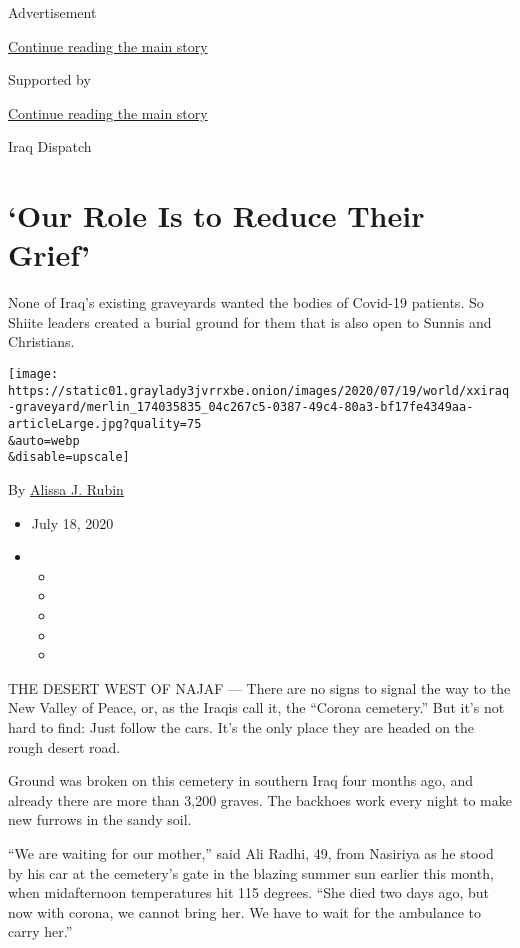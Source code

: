 Advertisement

\protect\hyperlink{after-top}{Continue reading the main story}

Supported by

\protect\hyperlink{after-sponsor}{Continue reading the main story}

Iraq Dispatch

\hypertarget{our-role-is-to-reduce-their-grief}{%
\section{`Our Role Is to Reduce Their
Grief'}\label{our-role-is-to-reduce-their-grief}}

None of Iraq's existing graveyards wanted the bodies of Covid-19
patients. So Shiite leaders created a burial ground for them that is
also open to Sunnis and Christians.

\texttt{[image: https://static01.graylady3jvrrxbe.onion/images/2020/07/19/world/xxiraq-graveyard/merlin\_174035835\_04c267c5-0387-49c4-80a3-bf17fe4349aa-articleLarge.jpg?quality=75\\\&auto=webp\\\&disable=upscale]}

By \href{https://www.nytimes3xbfgragh.onion/by/alissa-j-rubin}{Alissa J.
Rubin}

\begin{itemize}
\item
  July 18, 2020
\item
  \begin{itemize}
  \item
  \item
  \item
  \item
  \item
  \end{itemize}
\end{itemize}

THE DESERT WEST OF NAJAF --- There are no signs to signal the way to the
New Valley of Peace, or, as the Iraqis call it, the ``Corona cemetery.''
But it's not hard to find: Just follow the cars. It's the only place
they are headed on the rough desert road.

Ground was broken on this cemetery in southern Iraq four months ago, and
already there are more than 3,200 graves. The backhoes work every night
to make new furrows in the sandy soil.

``We are waiting for our mother,'' said Ali Radhi, 49, from Nasiriya as
he stood by his car at the cemetery's gate in the blazing summer sun
earlier this month, when midafternoon temperatures hit 115 degrees.
``She died two days ago, but now with corona, we cannot bring her. We
have to wait for the ambulance to carry her.''

